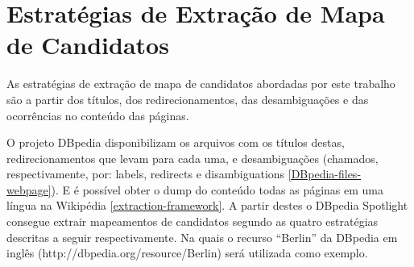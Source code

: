 \documentclass[10pt,a4paper]{llncs}
\begin{document}
\section{Estratégias de Extração de Mapa de Candidatos} \label{extracao-mapa-candidatos}
\indent\indent As estratégias de extração de mapa de candidatos abordadas por este trabalho são a partir dos títulos, dos redirecionamentos, das desambiguações e das ocorrências no conteúdo das páginas.

O projeto DBpedia disponibilizam os arquivos com os títulos destas, redirecionamentos que levam para cada uma, e desambiguações (chamados, respectivamente, por: labels, redirects e disambiguations \ref{DBpedia-files-webpage}). E é possível obter o dump do conteúdo todas as páginas em uma língua na Wikipédia \ref{extraction-framework}. A partir destes o DBpedia Spotlight consegue extrair mapeamentos de candidatos segundo as quatro estratégias descritas a seguir respectivamente. %
Na quais o recurso ``Berlin'' da DBpedia em inglês (http://dbpedia.org/resource/Berlin) será utilizada como exemplo.
\end{document}
